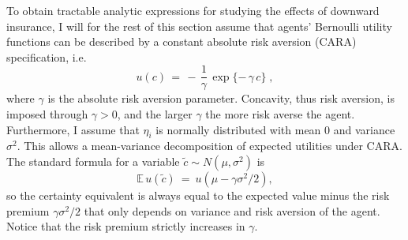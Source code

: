 To obtain tractable analytic expressions for studying the effects of downward insurance, I will for the rest of this section assume that agents' Bernoulli utility functions can be described by a constant absolute risk aversion (CARA) specification, i.e.
\begin{equation}
u(c) \, = \,  - \, \frac{1}{\gamma} \, \exp\{- \,  \gamma \, c \} \; ,
\end{equation}
where $\gamma$ is the absolute risk aversion parameter. Concavity, thus risk aversion, is imposed through $\gamma > 0$, and the larger $\gamma$ the more risk averse the agent. Furthermore, I assume that $\eta_i$ is normally distributed with mean $0$ and variance $\sigma^2$. This allows a mean-variance decomposition of expected utilities under CARA. The standard formula for a variable $\tilde{c} \sim N(\mu, \sigma^2)$ is
\begin{equation}
\mathbb{E} \, u(\tilde{c}) \: = \:  u\left(\mu -  \gamma \sigma^2 /2 \right),
\end{equation}
so the certainty equivalent is always equal to the expected value minus the risk premium $\gamma \sigma^2 /2$ that only depends on variance and risk aversion of the agent. Notice that the risk premium strictly increases in $\gamma$.

